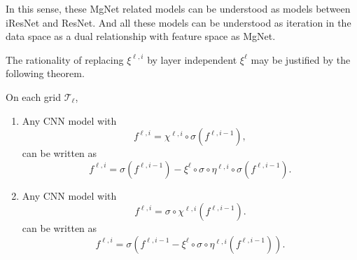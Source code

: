 
In this sense, these MgNet related models can be understood as
 models between iResNet and ResNet. And all these models can be
 understood as iteration in the data space as a dual relationship with
 feature space as MgNet.
 
 
The rationality of replacing  $\xi^{\ell,i}$ by layer independent $\xi^{\ell}$ may
be justified by the following theorem. 
\begin{theorem}\label{thm:CNN}
On each grid $\mathcal T_\ell$, 
\begin{enumerate}
	\item Any CNN model with
	\begin{equation}
	\label{CNN1}
	f^{\ell,i} =   \chi^{\ell,i} \circ \sigma (f^{\ell,i-1}),
	\end{equation} 
	can be written as
	\begin{equation}\label{Res-CNN1}
	f^{\ell,i} = \sigma(f^{\ell,i-1}) - \xi^{\ell} \circ \sigma \circ \eta^{\ell,i} \circ\sigma ( f^{\ell,i-1}).
	\end{equation}
	\item Any CNN model with 
	\begin{equation}
	\label{CNN2}
	f^{\ell,i} =   \sigma\circ\chi^{\ell,i} (f^{\ell,i-1}).
	\end{equation}
	can be written as 
	\begin{equation}\label{Res-CNN2}
	f^{\ell,i} = \sigma\left(f^{\ell,i-1} - \xi^{\ell} \circ \sigma \circ \eta^{\ell,i}  ( f^{\ell,i-1})\right).
	\end{equation}
\end{enumerate}

\end{theorem}

